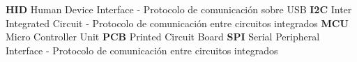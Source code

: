 \textbf{HID} Human Device Interface - Protocolo de comunicación sobre USB
\textbf{I2C} Inter Integrated Circuit - Protocolo de comunicación entre circuitos integrados
\textbf{MCU} Micro Controller Unit
\textbf{PCB} Printed Circuit Board
\textbf{SPI} Serial Peripheral Interface - Protocolo de comunicación entre circuitos integrados